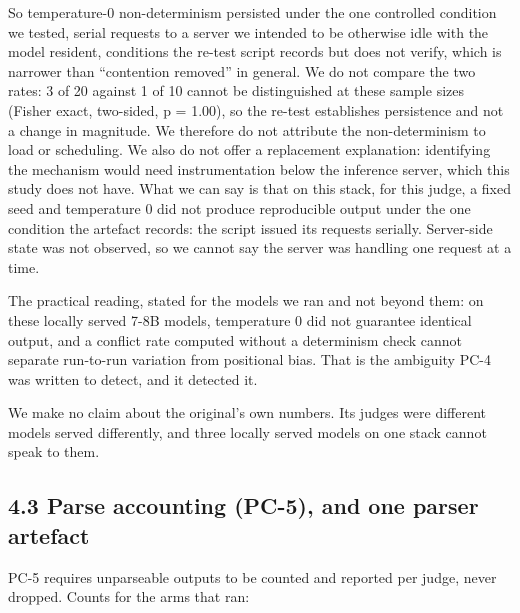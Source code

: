 So temperature-0 non-determinism persisted under the one controlled condition we tested, serial requests to a server we intended to be otherwise idle with the model resident, conditions the re-test script records but does not verify, which is narrower than ``contention removed'' in general. We do not compare the two
rates: 3 of 20 against 1 of 10 cannot be distinguished at these sample sizes (Fisher exact,
two-sided, p = 1.00), so the re-test establishes persistence and not a change in magnitude. We
therefore do not attribute the non-determinism to load or scheduling. We also
do not offer a replacement explanation: identifying the mechanism would need instrumentation below
the inference server, which this study does not have. What we can say is that on this stack, for
this judge, a fixed seed and temperature 0 did not produce reproducible output under the one
condition the artefact records: the script issued its requests serially. Server-side state was not
observed, so we cannot say the server was handling one request at a time.

The practical reading, stated for the models we ran and not beyond them: on these locally served
7-8B models, temperature 0 did not guarantee identical output, and a conflict rate computed without
a determinism check cannot separate run-to-run variation from positional bias. That is the
ambiguity PC-4 was written to detect, and it detected it.

We make no claim about the original's own numbers. Its judges were different models served
differently, and three locally served models on one stack cannot speak to them.

\subsection{4.3 Parse accounting (PC-5), and one parser artefact}\label{parse-accounting-pc-5-and-one-parser-artefact}

PC-5 requires unparseable outputs to be counted and reported per judge, never dropped. Counts for
the arms that ran:

